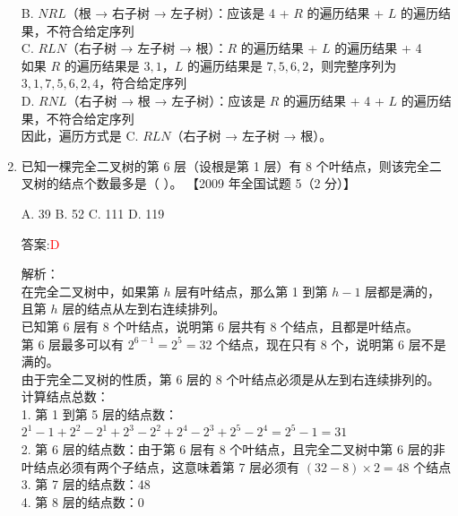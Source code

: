 \documentclass[lang=cn,newtx,10pt,scheme=chinese]{../../../elegantbook}
\begin{document}
\begin{enumerate}
        B. $NRL$（根 → 右子树 → 左子树）：应该是 4 + $R$ 的遍历结果 + $L$ 的遍历结果，不符合给定序列\\
        
        C. $RLN$（右子树 → 左子树 → 根）：$R$ 的遍历结果 + $L$ 的遍历结果 + 4\\
        如果 $R$ 的遍历结果是 $3, 1$，$L$ 的遍历结果是 $7, 5, 6, 2$，则完整序列为 $3, 1, 7, 5, 6, 2, 4$，符合给定序列\\
        
        D. $RNL$（右子树 → 根 → 左子树）：应该是 $R$ 的遍历结果 + 4 + $L$ 的遍历结果，不符合给定序列\\
        
        因此，遍历方式是 C. $RLN$（右子树 → 左子树 → 根）。\\
    
        \item 已知一棵完全二叉树的第 6 层（设根是第 1 层）有 8 个叶结点，则该完全二叉树的结点个数最多是（ ）。  
        【2009 年全国试题 5（2 分）】  
    
        A. 39 \quad B. 52 \quad C. 111 \quad D. 119  
    
        答案:\textcolor{red}{D}
        
        解析：\\
        在完全二叉树中，如果第 $h$ 层有叶结点，那么第 1 到第 $h-1$ 层都是满的，且第 $h$ 层的结点从左到右连续排列。\\
        
        已知第 6 层有 8 个叶结点，说明第 6 层共有 8 个结点，且都是叶结点。\\
        
        第 6 层最多可以有 $2^{6-1} = 2^5 = 32$ 个结点，现在只有 8 个，说明第 6 层不是满的。\\
        
        由于完全二叉树的性质，第 6 层的 8 个叶结点必须是从左到右连续排列的。\\
        
        计算结点总数：\\
        1. 第 1 到第 5 层的结点数：$2^1 - 1 + 2^2 - 2^1 + 2^3 - 2^2 + 2^4 - 2^3 + 2^5 - 2^4 = 2^5 - 1 = 31$\\
        2. 第 6 层的结点数：由于第 6 层有 8 个叶结点，且完全二叉树中第 6 层的非叶结点必须有两个子结点，这意味着第 7 层必须有 $(32-8) \times 2 = 48$ 个结点\\
        3. 第 7 层的结点数：48\\
        4. 第 8 层的结点数：0\\
        

\end{enumerate}
\end{document}
